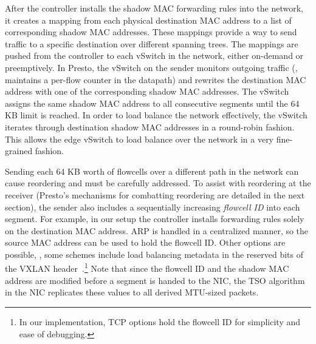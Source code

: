 After the controller installs the shadow MAC forwarding rules into the network, it creates a mapping
from each physical destination MAC address to a list of corresponding shadow MAC addresses. These mappings
provide a way to send traffic to a specific destination over different spanning trees. 
The mappings are pushed from the controller to each vSwitch in the network, either on-demand or preemptively.
In Presto, the vSwitch on the sender monitors outgoing traffic (\ie{}, maintains a per-flow counter in the datapath) 
and rewrites the destination MAC
address with one of the corresponding shadow MAC addresses.
The vSwitch assigns the same shadow MAC address to all consecutive segments until the 64 KB limit is reached.
In order to load balance the network effectively, the vSwitch 
iterates through destination shadow MAC addresses in a round-robin fashion. 
This allows the edge vSwitch to load balance over the network in a very fine-grained fashion.

Sending each 64 KB worth of flowcells over a different path in the network can cause reordering and must
be carefully addressed.
To assist with reordering at the receiver (Presto's mechanisms for combatting reordering are detailed in the next section), 
the sender also includes a sequentially increasing {\em flowcell ID} into each segment.
For example, 
in our setup the controller installs forwarding rules solely on the destination MAC address.
ARP is handled in a centralized manner, so
the source MAC address can be used to hold the flowcell ID. Other options are possible, 
\eg{}, some schemes include load balancing metadata in the reserved bits of the VXLAN header~\cite{nvo3}.\footnote{In our
implementation, TCP options hold the flowcell ID for simplicity and ease of debugging.}
Note that since the flowcell ID and the shadow MAC address are modified before a segment is handed to the NIC,
the TSO algorithm in the NIC replicates these values to all derived MTU-sized packets.

